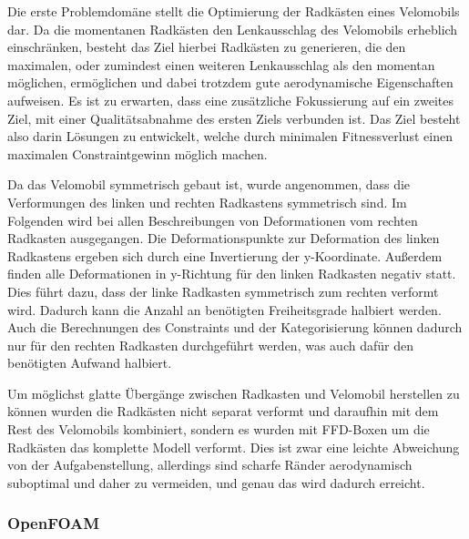Die erste Problemdomäne stellt die Optimierung der Radkästen eines Velomobils dar.
Da die momentanen Radkästen den Lenkausschlag des Velomobils erheblich einschränken, besteht das Ziel hierbei Radkästen zu generieren, die den maximalen, oder zumindest einen weiteren Lenkausschlag als den momentan möglichen, ermöglichen und dabei trotzdem gute aerodynamische Eigenschaften aufweisen.
Es ist zu erwarten, dass eine zusätzliche Fokussierung auf ein zweites Ziel, mit einer Qualitätsabnahme des ersten Ziels verbunden ist.
Das Ziel besteht also darin Lösungen zu entwickelt, welche durch minimalen Fitnessverlust einen maximalen Constraintgewinn möglich machen.

Da das Velomobil symmetrisch gebaut ist, wurde angenommen, dass die Verformungen des linken und rechten Radkastens symmetrisch sind.
Im Folgenden wird bei allen Beschreibungen von Deformationen vom rechten Radkasten ausgegangen.
Die Deformationspunkte zur Deformation des linken Radkastens ergeben sich durch eine Invertierung der y-Koordinate.
Außerdem finden alle Deformationen in y-Richtung für den linken Radkasten negativ statt.
Dies führt dazu, dass der linke Radkasten symmetrisch zum rechten verformt wird.
Dadurch kann die Anzahl an benötigten Freiheitsgrade halbiert werden. 
Auch die Berechnungen des Constraints und der Kategorisierung können dadurch nur für den rechten Radkasten durchgeführt werden, was auch dafür den benötigten Aufwand halbiert.

Um möglichst glatte Übergänge zwischen Radkasten und Velomobil herstellen zu können wurden die Radkästen nicht separat verformt und daraufhin mit dem Rest des Velomobils kombiniert, sondern es wurden mit FFD-Boxen um die Radkästen das komplette Modell verformt.
Dies ist zwar eine leichte Abweichung von der Aufgabenstellung, allerdings sind scharfe Ränder aerodynamisch suboptimal und daher zu vermeiden, und genau das wird dadurch erreicht.

\subsubsection{OpenFOAM}

